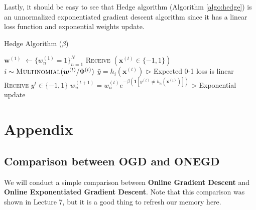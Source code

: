 \documentclass[11pt]{article}
\begin{document}
Lastly, it should be easy to see that Hedge algorithm (Algorithm \ref{algo:hedge}) is an unnormalized exponentiated gradient descent algorithm since it has a linear loss function and exponential weights update.
\begin{algorithm}[H]
\caption{Hedge Algorithm ($\beta$)}
\label{algo:hedge}
\begin{algorithmic}[1]
\STATE $\textbf{w}^{(1)}$ $\leftarrow \{w_n^{(1)} = 1\}_{n=1}^N$ 
\STATE \textsc{Receive} $(\bm{x}^(t) \in \{-1, 1\})$ \hfill
\STATE $i \sim \textsc{Multinomial}(\bm{w}^{(t)}/\Phi^{(t)})$ \hfill
\STATE $\hat{y} = h_i(\bm{x}^{(t)})$ \hfill $\triangleright$ Expected 0-1 loss is linear
\STATE \textsc{Receive} $y^t \in \{-1, 1\}$ \hfill
\STATE $w_n^{(t+1)} = w_n^{(t)}e^{-\beta (\bm{1}[y^{(t)} \neq h_n(\bm{x}^{(t)})])}$ \hfill $\triangleright$ Exponential update
\ENDFOR
\end{algorithmic}
\end{algorithm}

\nocite{*}
{


}

\section{Appendix}

\subsection{Comparison between OGD and ONEGD}
We will conduct a simple comparison between \textbf{Online Gradient Descent} and \textbf{Online Exponentiated Gradient Descent}. Note that this comparison was shown in Lecture 7, but it is a good thing to refresh our memory here.
\end{document}
